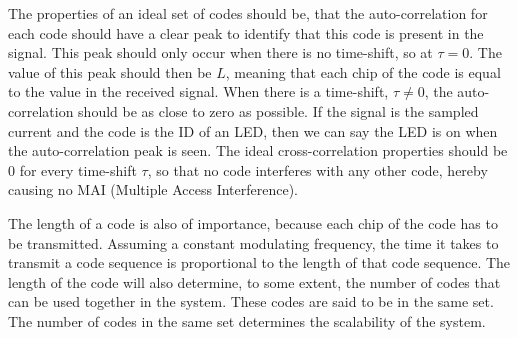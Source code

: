 



The properties of an ideal set of codes should be, that the auto-correlation for each code should have a clear peak to identify that this code is present in the signal.
This peak should only occur when there is no time-shift, so at $\tau = 0$.
The value of this peak should then be $L$, meaning that each chip of the code is equal to the value in the received signal.
When there is a time-shift, $\tau \neq 0$, the auto-correlation should be as close to zero as possible.
If the signal is the sampled current and the code is the ID of an LED, then we can say the LED is on when the auto-correlation peak is seen.
The ideal cross-correlation properties should be $0$ for every time-shift $\tau$, so that no code interferes with any other code, hereby causing no MAI (Multiple Access Interference).



The length of a code is also of importance, because each chip of the code has to be transmitted.
Assuming a constant modulating frequency, the time it takes to transmit a code sequence is proportional to the length of that code sequence.
The length of the code will also determine, to some extent, the number of codes that can be used together in the system.
These codes are said to be in the same set.
The number of codes in the same set determines the scalability of the system.





